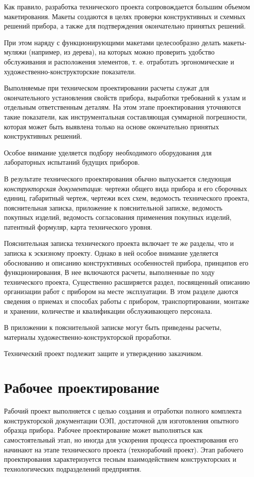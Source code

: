 Как правило, разработка технического проекта сопровождается большим объемом макетирования. Макеты создаются в целях проверки конструктивных и схемных решений прибора, а также для подтверждения окончательно принятых решений. 

При этом наряду с функционирующими макетами целесообразно делать макеты-муляжи (например, из дерева), на которых можно проверить удобство обслуживания и расположения элементов, т. е. отработать эргономические и художественно-конструкторские показатели.

Выполняемые при техническом проектировании расчеты служат для окончательного установления свойств прибора, выработки требований к узлам и отдельным ответственным деталям. На этом этапе проектирования уточняются такие показатели, как инструментальная составляющая суммарной погрешности, которая может быть выявлена только на основе окончательно принятых конструктивных решений. 

Особое внимание уделяется подбору необходимого оборудования для лабораторных испытаний будущих приборов.

В результате технического проектирования обычно выпускается следующая \textit{конструкторская документация}: чертежи общего вида прибора и его сборочных единиц, габаритный чертеж, чертежи всех схем, ведомость технического проекта, пояснительная записка, приложение к пояснительной записке, ведомость покупных изделий, ведомость согласования применения покупных изделий, патентный формуляр, карта технического уровня.

Пояснительная записка технического проекта включает те же разделы, что и записка к эскизному проекту. Однако в ней особое внимание уделяется обоснованию и описанию конструктивных особенностей прибора, принципов его функционирования, В нее включаются расчеты, выполненные по ходу технического проекта, Существенно расширяется раздел, посвященный описанию организации работ с прибором на месте эксплуатации. В этом разделе даются сведения о приемах и способах работы с прибором, транспортировании, монтаже и хранении, количестве и квалификации обслуживающего персонала.

В приложении к пояснительной записке могут быть приведены расчеты, материалы ху\-до\-жест\-вен\-но-конструкторской проработки.

Технический проект подлежит защите и утверждению заказчиком.

\section{Рабочее проектирование}
Рабочий проект выполняется с целью создания и отработки полного комплекта конструкторской документации ОЭП, достаточной для изготовления опытного образца прибора. Рабочее проектирование может выполняться как самостоятельный этап, но иногда для ускорения процесса проектирования его начинают на этапе технического проекта (технорабочий проект). Этап рабочего проектирования характеризуется тесным взаимодействием конструкторских и технологических подразделений предприятия.

